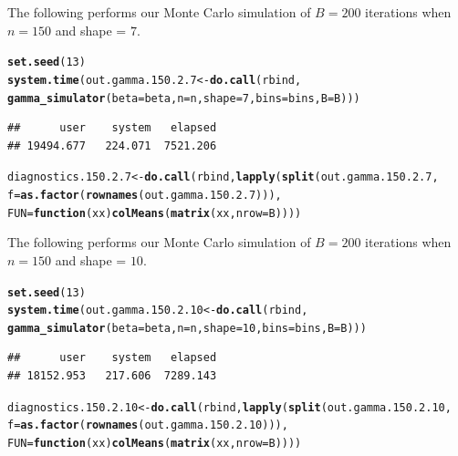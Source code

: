 \documentclass[11pt]{article}\usepackage[]{graphicx}\usepackage[]{color}
\makeatletter
\newcommand{\hlnum}[1]{\textcolor[rgb]{0.686,0.059,0.569}{#1}}%
\newcommand{\hlstd}[1]{\textcolor[rgb]{0.345,0.345,0.345}{#1}}%
\newcommand{\hlkwa}[1]{\textcolor[rgb]{0.161,0.373,0.58}{\textbf{#1}}}%
\newcommand{\hlkwb}[1]{\textcolor[rgb]{0.69,0.353,0.396}{#1}}%
\newcommand{\hlkwc}[1]{\textcolor[rgb]{0.333,0.667,0.333}{#1}}%
\newcommand{\hlkwd}[1]{\textcolor[rgb]{0.737,0.353,0.396}{\textbf{#1}}}%
\newenvironment{kframe}{%
 \def\at@end@of@kframe{}%
 \ifinner\ifhmode%
  \def\at@end@of@kframe{\end{minipage}}%
  \begin{minipage}{\columnwidth}%
 \fi\fi%
 \def\FrameCommand##1{\hskip\@totalleftmargin \hskip-\fboxsep
 \colorbox{shadecolor}{##1}\hskip-\fboxsep
     \hskip-\linewidth \hskip-\@totalleftmargin \hskip\columnwidth}%
 \MakeFramed {\advance\hsize-\width
   \@totalleftmargin\z@ \linewidth\hsize
   \@setminipage}}%
 {\par\unskip\endMakeFramed%
 \at@end@of@kframe}
\newenvironment{knitrout}{}{} %
\makeatother
\begin{document}
The following performs our Monte Carlo simulation of $B = 200$ iterations 
when $n = 150$ and shape = $7$.

\begin{knitrout}
\color{fgcolor}\begin{kframe}
\begin{alltt}
\hlkwd{set.seed}\hlstd{(}\hlnum{13}\hlstd{)}
\hlkwd{system.time}\hlstd{(out.gamma.150.2.7} \hlkwb{<-} \hlkwd{do.call}\hlstd{(rbind,}
  \hlkwd{gamma_simulator}\hlstd{(}\hlkwc{beta} \hlstd{= beta,} \hlkwc{n} \hlstd{= n,} \hlkwc{shape} \hlstd{=} \hlnum{7}\hlstd{,} \hlkwc{bins} \hlstd{= bins,} \hlkwc{B} \hlstd{= B)))}
\end{alltt}
\begin{verbatim}
##      user    system   elapsed 
## 19494.677   224.071  7521.206
\end{verbatim}
\begin{alltt}
\hlstd{diagnostics.150.2.7} \hlkwb{<-} \hlkwd{do.call}\hlstd{(rbind,} \hlkwd{lapply}\hlstd{(}\hlkwd{split}\hlstd{(out.gamma.150.2.7,}
  \hlkwc{f} \hlstd{=} \hlkwd{as.factor}\hlstd{(}\hlkwd{rownames}\hlstd{(out.gamma.150.2.7))),}
  \hlkwc{FUN} \hlstd{=} \hlkwa{function}\hlstd{(}\hlkwc{xx}\hlstd{)} \hlkwd{colMeans}\hlstd{(}\hlkwd{matrix}\hlstd{(xx,} \hlkwc{nrow} \hlstd{= B))))}
\end{alltt}
\end{kframe}
\end{knitrout}




The following performs our Monte Carlo simulation of $B = 200$ iterations 
when $n = 150$ and shape = $10$.

\begin{knitrout}
\color{fgcolor}\begin{kframe}
\begin{alltt}
\hlkwd{set.seed}\hlstd{(}\hlnum{13}\hlstd{)}
\hlkwd{system.time}\hlstd{(out.gamma.150.2.10} \hlkwb{<-} \hlkwd{do.call}\hlstd{(rbind,}
  \hlkwd{gamma_simulator}\hlstd{(}\hlkwc{beta} \hlstd{= beta,} \hlkwc{n} \hlstd{= n,} \hlkwc{shape} \hlstd{=} \hlnum{10}\hlstd{,} \hlkwc{bins} \hlstd{= bins,} \hlkwc{B} \hlstd{= B)))}
\end{alltt}
\begin{verbatim}
##      user    system   elapsed 
## 18152.953   217.606  7289.143
\end{verbatim}
\begin{alltt}
\hlstd{diagnostics.150.2.10} \hlkwb{<-} \hlkwd{do.call}\hlstd{(rbind,} \hlkwd{lapply}\hlstd{(}\hlkwd{split}\hlstd{(out.gamma.150.2.10,}
  \hlkwc{f} \hlstd{=} \hlkwd{as.factor}\hlstd{(}\hlkwd{rownames}\hlstd{(out.gamma.150.2.10))),}
  \hlkwc{FUN} \hlstd{=} \hlkwa{function}\hlstd{(}\hlkwc{xx}\hlstd{)} \hlkwd{colMeans}\hlstd{(}\hlkwd{matrix}\hlstd{(xx,} \hlkwc{nrow} \hlstd{= B))))}
\end{alltt}
\end{kframe}
\end{knitrout}
\end{document}
